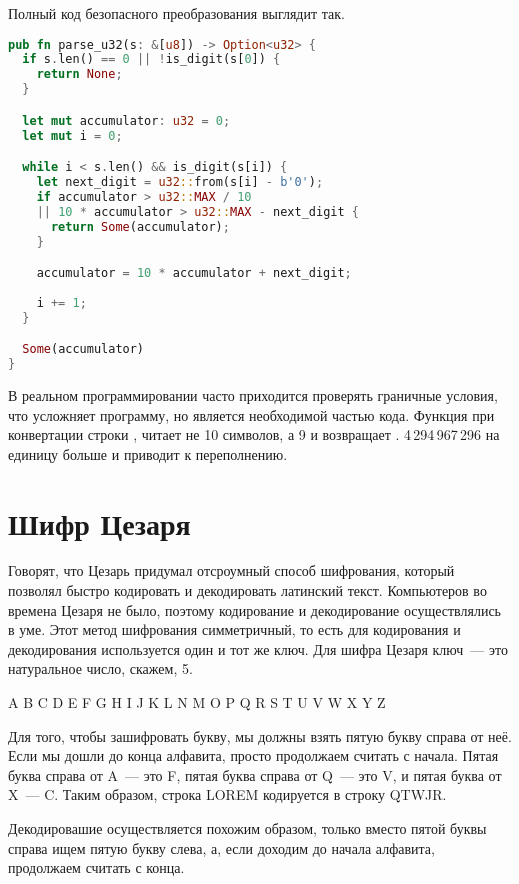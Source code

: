 Полный код безопасного преобразования выглядит так.

\begin{lstlisting}[language=Rust]
pub fn parse_u32(s: &[u8]) -> Option<u32> {
  if s.len() == 0 || !is_digit(s[0]) {
    return None;
  }

  let mut accumulator: u32 = 0;
  let mut i = 0;

  while i < s.len() && is_digit(s[i]) {
    let next_digit = u32::from(s[i] - b'0');
    if accumulator > u32::MAX / 10
    || 10 * accumulator > u32::MAX - next_digit {
      return Some(accumulator);
    }

    accumulator = 10 * accumulator + next_digit;
        
    i += 1;
  }

  Some(accumulator)
}
\end{lstlisting}

В реальном программировании часто приходится проверять граничные условия, что усложняет программу, но является необходимой частью кода.
Функция  при конвертации строки , читает не 10 символов, а 9 и возвращает .
4\,294\,967\,296 на единицу больше  и приводит к переполнению.

\section{Шифр Цезаря}

Говорят, что Цезарь придумал отсроумный способ шифрования, который позволял быстро кодировать и декодировать латинский текст.
Компьютеров во времена Цезаря не было, поэтому кодирование и декодирование осуществлялись в уме.
Этот метод шифрования симметричный, то есть для кодирования и декодирования используется один и тот же ключ.
Для шифра Цезаря ключ~--- это натуральное число, скажем, 5.

A B C D E F G H I J K L N M O P Q R S T U V W X Y Z

Для того, чтобы зашифровать букву, мы должны взять пятую букву справа от неё.
Если мы дошли до конца алфавита, просто продолжаем считать с начала.
Пятая буква справа от A~--- это F, пятая буква справа от Q~--- это V, и пятая буква от X~--- C.
Таким образом, строка LOREM кодируется в строку QTWJR.

Декодировашие осуществляется похожим образом, только вместо пятой буквы справа ищем пятую букву слева, а, если доходим до начала алфавита, продолжаем считать с конца.

